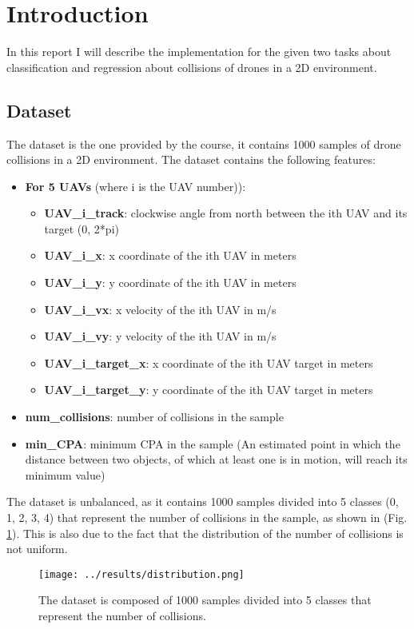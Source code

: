 \section{Introduction}
In this report I will describe the implementation for the given two tasks about classification and regression about collisions of drones in a 2D environment.

\subsection{Dataset}
The dataset is the one provided by the course, it contains 1000 samples of drone collisions in a 2D environment. The dataset contains the following features:
\begin{itemize}
    \item \textbf{For 5 UAVs} (where i is the UAV number)):
    \begin{itemize}
        \item \textbf{UAV\_i\_track}: clockwise angle from north between the ith UAV and its target (0, 2*pi)
        \item \textbf{UAV\_i\_x}: x coordinate of the ith UAV in meters
        \item \textbf{UAV\_i\_y}: y coordinate of the ith UAV in meters
        \item \textbf{UAV\_i\_vx}: x velocity of the ith UAV in m/s
        \item \textbf{UAV\_i\_vy}: y velocity of the ith UAV in m/s
        \item \textbf{UAV\_i\_target\_x}: x coordinate of the ith UAV target in meters
        \item \textbf{UAV\_i\_target\_y}: y coordinate of the ith UAV target in meters
    \end{itemize}
    \item \textbf{num\_collisions}: number of collisions in the sample
    \item \textbf{min\_CPA}: minimum CPA in the sample (An estimated point in which the distance between two objects, of which at least one is in motion, will reach its minimum value)
\end{itemize}
The dataset is unbalanced, as it contains 1000 samples divided into 5 classes (0, 1, 2, 3, 4) that represent the number of collisions in the sample, as shown in (Fig. \ref{fig:dataset_distribution}).
This is also due to the fact that the distribution of the number of collisions is not uniform.

\begin{figure}
    \centering
    \texttt{[image: ../results/distribution.png]}
    \caption{The dataset is composed of 1000 samples divided into 5 classes that represent the number of collisions.}
    \label{fig:dataset_distribution}
\end{figure}


